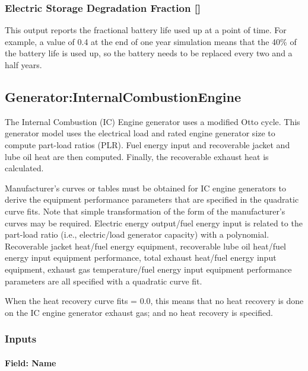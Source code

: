 \subsubsection{\texorpdfstring{Electric Storage Degradation Fraction {[]}}{Electric Storage Degradation Fraction }}\label{electric-storage-degradation-fraction}

This output reports the fractional battery life used up at a point of time. For example, a value of 0.4 at the end of one year simulation means that the 40\% of the battery life is used up, so the battery needs to be replaced every two and a half years.

\subsection{Generator:InternalCombustionEngine}\label{generatorinternalcombustionengine}

The Internal Combustion (IC) Engine generator uses a modified Otto cycle. This generator model uses the electrical load and rated engine generator size to compute part-load ratios (PLR). Fuel energy input and recoverable jacket and lube oil heat are then computed. Finally, the recoverable exhaust heat is calculated.

Manufacturer's curves or tables must be obtained for IC engine generators to derive the equipment performance parameters that are specified in the quadratic curve fits. Note that simple transformation of the form of the manufacturer's curves may be required. Electric energy output/fuel energy input is related to the part-load ratio (i.e., electric/load generator capacity) with a polynomial. Recoverable jacket heat/fuel energy equipment, recoverable lube oil heat/fuel energy input equipment performance, total exhaust heat/fuel energy input equipment, exhaust gas temperature/fuel energy input equipment performance parameters are all specified with a quadratic curve fit.

When the heat recovery curve fits = 0.0, this means that no heat recovery is done on the IC engine generator exhaust gas; and no heat recovery is specified.

\subsubsection{Inputs}\label{inputs-7-007}

\paragraph{Field: Name}\label{field-name-8-004}

